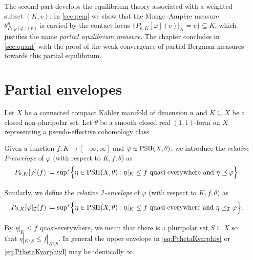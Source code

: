 The second part develops the equilibrium theory associated with a weighted subset $(K,v)$. In \cref{sec:pem} we show that the Monge--Amp\`ere measure $\theta_{P_{\theta,K}[\varphi](v)}^n$ is carried by the contact locus $\{P_{\theta,K}[\varphi](v)|_K=v\}\subseteq K$, which justifies the name \emph{partial equilibrium measure}. The chapter concludes in \cref{sec:quant} with the proof of the weak convergence of partial Bergman measures towards this partial equilibrium.

\section{Partial envelopes}\label{sec:envrel}
Let $X$ be a connected compact Kähler manifold of dimension $n$ and $K \subseteq X$ be a closed non-pluripolar set.
Let $\theta$ be a smooth closed real $(1,1)$-form on $X$ representing a pseudo-effective cohomology class.

\begin{definition}\label{def:partial_env}
    Given a function $f\colon K\rightarrow [-\infty,\infty]$ and $\varphi\in \mathrm{PSH}(X,\theta)$, we introduce the \emph{relative $P$-envelope} of $\varphi$ (with respect to $K,f,\theta$) as
    \begin{equation}\label{eq:PthetaKvarphiv}
    P_{\theta,K}[\varphi](f)\coloneqq  \operatorname*{sup}_{}{}\!{}^{*} \Bigl\{ \eta \in \mathrm{PSH}(X,\theta): \eta|_K \leq f  \textup{ quasi-everywhere and } \eta\preceq \varphi\Bigr\}.
    \end{equation}

    Similarly, we define the \emph{relative $\mathcal{I}$-envelope} of $\varphi$ (with respect to $K,f,\theta$) as
    \begin{equation}\label{eq:PthetaKvarphivI}
    P_{\theta,K}[\varphi]_{\mathcal{I}}(f)\coloneqq  \operatorname*{sup}_{}{}\!{}^{*} \Bigl\{ \eta \in \mathrm{PSH}(X,\theta): \eta|_K \leq f  \textup{ quasi-everywhere and } \eta\preceq_{\mathcal{I}} \varphi\Bigr\}.
    \end{equation}
\end{definition}
By $\eta|_K\leq f$ quasi-everywhere, we mean that there is a pluripolar set $S\subseteq X$ so that $\eta|_{K\setminus S}\leq f|_{K\setminus S}$. In general the upper envelope in \eqref{eq:PthetaKvarphiv} or \eqref{eq:PthetaKvarphivI} may be identically $\infty$.

